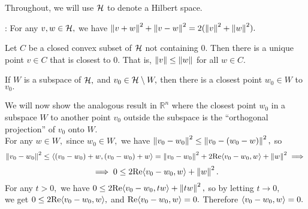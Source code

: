 Throughout, we will use $\mathcal{H}$ to denote a Hilbert space.

\begin{frame*}
\noindent{}: For any $v,w\in\mathcal{H},$ we have $\left\lVert v+w\right\rVert^2+\left\lVert v-w\right\rVert^2=2(\left\lVert v\right\rVert^2+\left\lVert w\right\rVert^2).$ \\
\end{frame*}

\begin{prop}
Let $C$ be a closed convex subset of $\mathcal{H}$ not containing $0.$ Then there is a unique point $v\in C$ that is closest to $0.$ That is, $\left\lVert v\right\rVert\leq\left\lVert w\right\rVert$ for all $w\in C.$ \\
\end{prop}

\begin{cor}
If $W$ is a subspace of $\mathcal{H},$ and $v_0\in\mathcal{H}\setminus W,$ then there is a closest point $w_0\in W$ to $v_0.$
\end{cor}

\noindent We will now show the analogous result in $\mathbb{R}^n$ where the closest point $w_0$ in a subspace $W$ to another point $v_0$ outside the subspace is the ``orthogonal projection'' of $v_0$ onto $W$.\\

\noindent For any $w\in W,$ since $w_0\in W,$ we have $\left\lVert v_0-w_0\right\rVert^2\leq\left\lVert v_0-(w_0-w)\right\rVert^2,$ so
$$\left\lVert v_0-w_0\right\rVert^2\leq\langle (v_0-w_0)+w,(v_0-w_0)+w\rangle=\left\lVert v_0-w_0\right\rVert^2+2\text{Re}\langle v_0-w_0,w\rangle+\left\lVert w\right\rVert^2\implies$$
$$\implies 0\leq 2\text{Re}\langle v_0-w_0,w\rangle+\left\lVert w\right\rVert^2.$$
For any $t>0,$ we have $0\leq 2\text{Re}\langle v_0-w_0,tw\rangle+\left\lVert tw\right\rVert^2,$ so by letting $t\rightarrow 0,$ \\
we get $0\leq 2\text{Re}\langle v_0-w_0,w\rangle,$ and $\text{Re}\langle v_0-w_0,w\rangle=0.$ Therefore $\langle v_0-w_0,w\rangle=0.$ \\

